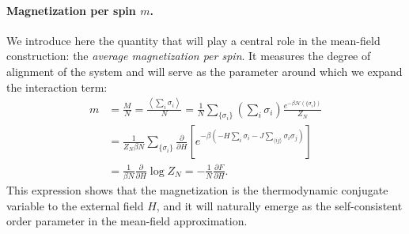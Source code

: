 \paragraph{Magnetization per spin \(m\).}
We introduce here the quantity that will play a central role in the mean-field construction: the \textit{average magnetization per spin}. It measures the degree of alignment of the system and will serve as the parameter around which we expand the interaction term:
\[
    \begin{aligned}
        m
         & = \frac{M}{N}
        = \frac{\left\langle \sum_{i} \sigma_i \right\rangle}{N}
        = \frac{1}{N}
        \sum_{\{\sigma_i\}}
        \left( \sum_{i} \sigma_i \right)
        \frac{e^{-\beta \mathcal{H}(\{\sigma_i\})}}{Z_N}            \\
         & = \frac{1}{Z_N \beta N}
        \sum_{\{\sigma_i\}}
        \frac{\partial}{\partial H}
        \left[
            e^{-\beta \left(
                    -H\sum_i \sigma_i
                    - J \sum_{\langle ij \rangle} \sigma_i \sigma_j
                    \right)}
        \right]                                                     \\
         & = \frac{1}{\beta N} \frac{\partial}{\partial H} \log Z_N
        = -\frac{1}{N}\frac{\partial F}{\partial H}.
    \end{aligned}
\]
This expression shows that the magnetization is the thermodynamic conjugate variable to the external field \(H\), and it will naturally emerge as the self-consistent order parameter in the mean-field approximation.

